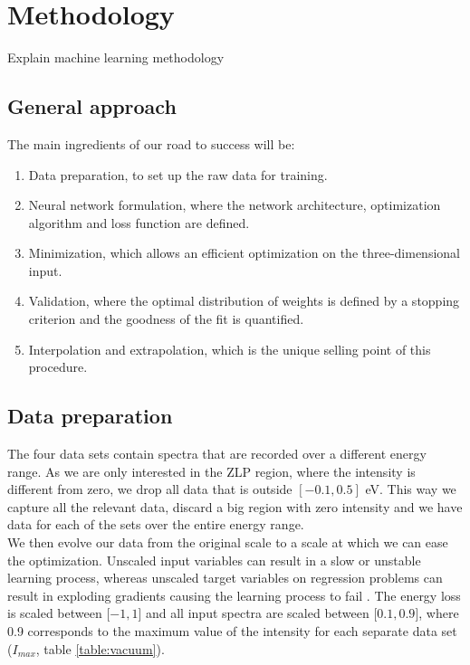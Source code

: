 \section{Methodology}
\label{sec:methodology}

Explain machine learning methodology

\subsection{General approach}

The main ingredients of our road to success will be:
\begin{enumerate}
    \item Data preparation, to set up the raw data for training.
    \item Neural network formulation, where the network architecture, optimization algorithm and loss function are defined.
    \item Minimization, which allows an efficient optimization on the three-dimensional input.
    \item Validation, where the optimal distribution of weights is defined by a stopping criterion and the goodness of the fit is quantified. 
    \item Interpolation and extrapolation, which is the unique selling point of this procedure. 
\end{enumerate}

\subsection{Data preparation}
The four data sets contain spectra that are recorded over a different energy range. As we are only interested in the ZLP region, where the intensity is different from zero, we drop all data that is outside $[-0.1, 0.5]$ eV. This way we capture all the relevant data, discard a big region with zero intensity and we have data for each of the sets over the entire energy range. \\
We then evolve our data from the original scale to a scale at which we can ease the optimization. Unscaled input variables can result in a slow or unstable learning process, whereas unscaled target variables on regression problems can result in exploding gradients causing the learning process to fail \cite{juan}. The energy loss is scaled between [$-1,1$] and all input spectra are scaled between [$0.1, 0.9$], where 0.9 corresponds to the maximum value of the intensity for each separate data set ($I_{max}$, table \ref{table:vacuum}). 

